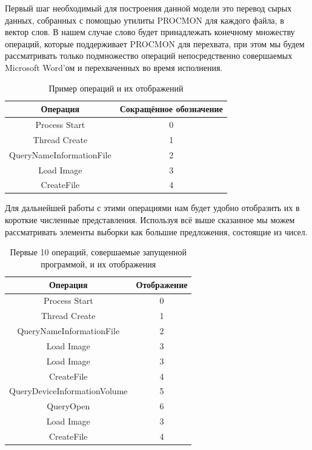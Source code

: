 Первый шаг необходимый для построения данной модели это перевод сырых данных, собранных с помощью утилиты PROCMON для каждого файла, в вектор слов. В нашем случае слово будет принадлежать конечному множеству операций, которые поддерживает PROCMON для перехвата, при этом мы будем рассматривать только подмножество операций непосредственно совершаемых Microsoft Word’ом и перехваченных во время исполнения.

\bgroup
\def\arraystretch{1.5}%
\begin{table}[ht]
\caption{Пример операций и их отображений}
\label{tab_weight}
\centering
    \begin{tabular}{|c|c|}
    \hline \rowcolor{lightgray!50} Операция & Сокращённое обозначение \\
    \hline Process Start &  0 \\
    \hline Thread Create &  1 \\
    \hline QueryNameInformationFile &  2 \\
    \hline Load Image &  3 \\
    \hline CreateFile &  4 \\
    \hline
    \end{tabular}
\end{table}
\egroup

Для дальнейшей работы с этими операциями нам будет удобно отобразить их в короткие численные представления. Используя всё выше сказанное мы можем рассматривать элементы выборки как большие предложения, состоящие из чисел.

\bgroup
\def\arraystretch{1.5}%
\begin{table}[ht]
\caption{Первые 10 операций, совершаемые запущенной программой, и их отображения}
\label{tab_weight}
\centering
    \begin{tabular}{|c|c|}
    \hline \rowcolor{lightgray!50} Операция & Отображение \\
    \hline Process Start &  0 \\
    \hline Thread Create &  1 \\
    \hline QueryNameInformationFile &  2 \\
    \hline Load Image &  3 \\
    \hline Load Image &  3 \\
    \hline CreateFile &  4 \\
    \hline QueryDeviceInformationVolume &  5 \\
    \hline QueryOpen &  6 \\
    \hline Load Image &  3 \\
    \hline CreateFile &  4 \\
    \hline
    \end{tabular}
\end{table}
\egroup

